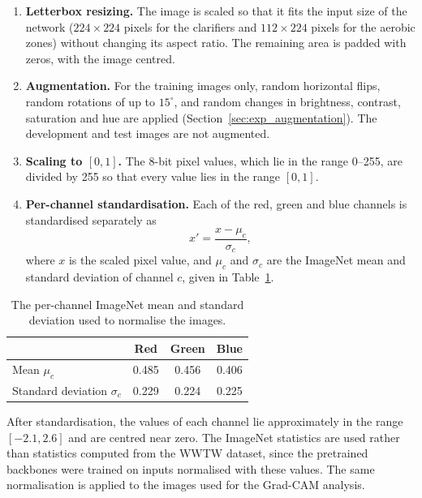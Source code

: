 \begin{enumerate}
    \item \textbf{Letterbox resizing.} The image is scaled so that it fits the input size of the network ($224\times224$ pixels for the clarifiers and $112\times224$ pixels for the aerobic zones) without changing its aspect ratio. The remaining area is padded with zeros, with the image centred.
    \item \textbf{Augmentation.} For the training images only, random horizontal flips, random rotations of up to $15^\circ$, and random changes in brightness, contrast, saturation and hue are applied (Section~\ref{sec:exp_augmentation}). The development and test images are not augmented.
    \item \textbf{Scaling to $[0, 1]$.} The 8-bit pixel values, which lie in the range 0--255, are divided by 255 so that every value lies in the range $[0, 1]$.
    \item \textbf{Per-channel standardisation.} Each of the red, green and blue channels is standardised separately as
    \begin{equation}
        x' = \frac{x - \mu_c}{\sigma_c},
    \end{equation}
    where $x$ is the scaled pixel value, and $\mu_c$ and $\sigma_c$ are the ImageNet mean and standard deviation of channel $c$, given in Table~\ref{tab:imagenet_norm}.
\end{enumerate}

\begin{table}[htbp]
\centering
\caption{The per-channel ImageNet mean and standard deviation used to normalise the images.}
\label{tab:imagenet_norm}
\begin{tabular}{lccc}
\toprule
 & \textbf{Red} & \textbf{Green} & \textbf{Blue} \\
\midrule
Mean $\mu_c$ & 0.485 & 0.456 & 0.406 \\
Standard deviation $\sigma_c$ & 0.229 & 0.224 & 0.225 \\
\bottomrule
\end{tabular}
\end{table}

After standardisation, the values of each channel lie approximately in the range $[-2.1, 2.6]$ and are centred near zero. The ImageNet statistics are used rather than statistics computed from the WWTW dataset, since the pretrained backbones were trained on inputs normalised with these values. The same normalisation is applied to the images used for the Grad-CAM analysis.
